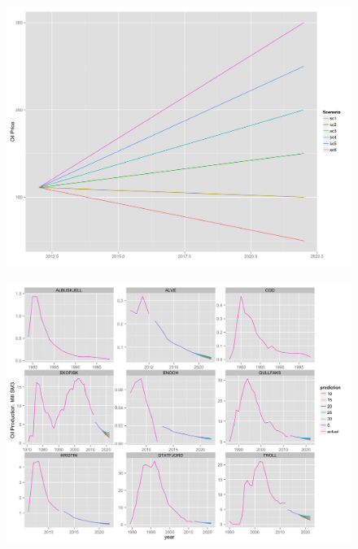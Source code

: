 \documentclass{beamer}
\begin{document}
\begin{frame}[plain]

	\begin{figure}
		\includegraphics[width=.8\textwidth]{price_scenario.png}
		\caption{}
		\label{price_scenario}
\end{figure}
\end{frame}

\begin{frame}[plain]
	\begin{figure}
		\includegraphics[width=.8\textwidth]{field_lev_forecast.png}
		\caption{}
		\label{field_lev_forecast}
	\end{figure}

\end{frame}
\end{document}
